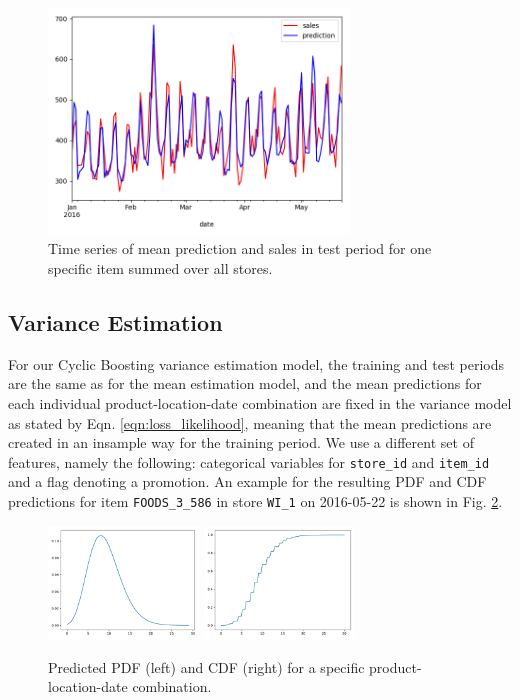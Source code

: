\documentclass[BCOR=1mm, DIV=calc,10pt,
twoside=true,
twocolumn,
headings=normal]{scrartcl}
\newcommand{\fig}{Fig. }
\newcommand{\eqn}{Eqn. }
\begin{document}
\begin{figure}
\begin{center}
\includegraphics[width=8cm]{../figures/mean_prediction}
\caption{\label{fig:mean_prediction} Time series of mean prediction and sales in test period for one specific item summed over all stores.}
\end{center}
\end{figure}

\subsection{Variance Estimation}

For our Cyclic Boosting variance estimation model, the training and test periods are the same as for the mean estimation model, and the mean predictions for each individual product-location-date combination are fixed in the variance model as stated by \eqn \eqref{eqn:loss_likelihood}, meaning that the mean predictions are created in an insample way for the training period. We use a different set of features, namely the following: categorical variables for \texttt{store\_id} and \texttt{item\_id} and a flag denoting a promotion. An example for the resulting PDF and CDF predictions for item \texttt{FOODS\_3\_586} in store \texttt{WI\_1} on 2016-05-22 is shown in \fig \ref{fig:pdf_example}.

\begin{figure}
\begin{center}
\includegraphics[width=4cm]{../figures/pdf}
\includegraphics[width=4cm]{../figures/cdf}
\caption{\label{fig:pdf_example} Predicted PDF (left) and CDF (right) for a specific product-location-date combination.}
\end{center}
\end{figure}
\end{document}
